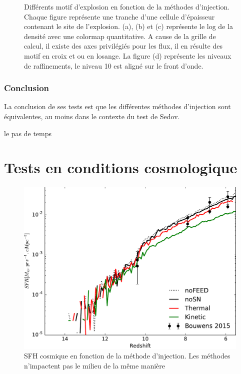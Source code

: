 \begin{figure}[htpb]
    \caption{Différents motif d'explosion en fonction de la méthodes d'injection.
    Chaque figure représente une tranche d'une cellule d'épaisseur contenant le site de l'explosion.
    (a), (b) et (c) représente le log de la densité avec une colormap quantitative.
    A cause de la grille de calcul, il existe des axes privilégiés pour les flux, il en résulte des motif en croix et ou en losange.
    La figure (d) représente les niveaux de raffinements, le niveau 10 est aligné sur le front d'onde.
    }
 	\label{fig:sedovslice}
\end{figure}



\subsubsection{Conclusion}

La conclusion de ses tests est que les différentes méthodes d'injection sont équivalentes, au moins dans le contexte du test de Sedov.





le pas de temps\\
\section{Tests en conditions cosmologique}

\begin{figure}[bth]
        \includegraphics[width=.95\textwidth]{img/03/sedov/SFRmethode.pdf} 
        \caption{SFH cosmique en fonction de la méthode d'injection.
        Les méthodes n'impactent pas le milieu de la même manière
        }
 		\label{fig:sfr_methode}
\end{figure}


